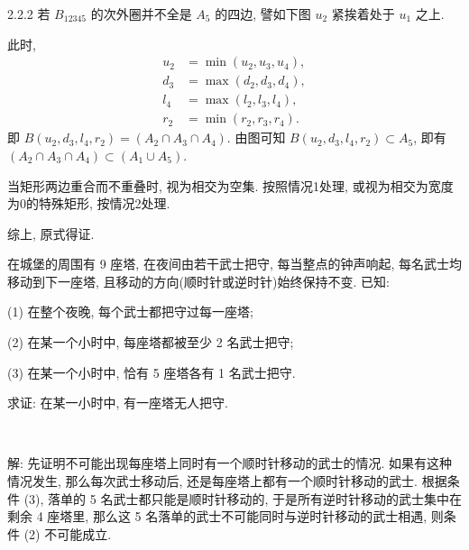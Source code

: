 2.2.2 若 $B_{12345}$ 的次外圈并不全是 $A_5$ 的四边, 譬如下图 $u_2$ 紧挨着处于 $u_1$ 之上.
\begin{figure*}[htbp]
\centering
{}
\end{figure*}

\noindent 此时, 
\begin{align*}
u_2 &= \min(u_2, u_3, u_4), \\
d_3 &= \max(d_2, d_3, d_4), \\
l_4 &= \max(l_2, l_3, l_4), \\
r_2 &= \min(r_2, r_3, r_4).
\end{align*}
即 $B(u_2, d_3, l_4, r_2) = (A_2\cap A_3\cap A_4)$. 由图可知 $B(u_2, d_3, l_4, r_2)\subset A_5$, 即有 $(A_2\cap A_3\cap A_4) \subset (A_1\cup A_5)$.

当矩形两边重合而不重叠时, 视为相交为空集. 按照情况1处理, 或视为相交为宽度为0的特殊矩形, 按情况2处理.

综上, 原式得证.


\newpage
在城堡的周围有 9 座塔, 在夜间由若干武士把守, 每当整点的钟声响起, 每名武士均移动到下一座塔, 且移动的方向(顺时针或逆时针)始终保持不变. 已知: 

(1) 在整个夜晚, 每个武士都把守过每一座塔; 

(2) 在某一个小时中, 每座塔都被至少 2 名武士把守;

(3) 在某一个小时中, 恰有 5 座塔各有 1 名武士把守.

求证: 在某一小时中, 有一座塔无人把守.

~

解: 先证明不可能出现每座塔上同时有一个顺时针移动的武士的情况. 如果有这种情况发生, 那么每次武士移动后, 还是每座塔上都有一个顺时针移动的武士. 根据条件 (3), 落单的 5 名武士都只能是顺时针移动的, 于是所有逆时针移动的武士集中在剩余 4 座塔里, 那么这 5 名落单的武士不可能同时与逆时针移动的武士相遇, 则条件 (2) 不可能成立.

